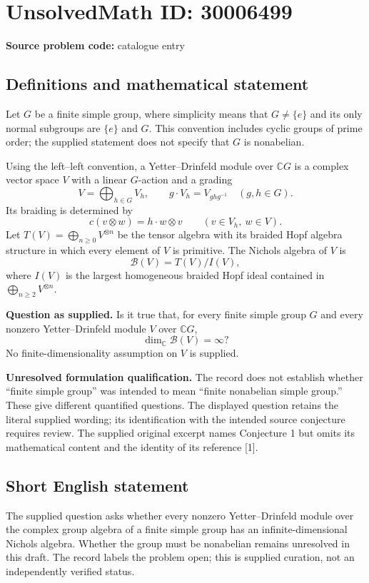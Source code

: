 \documentclass[11pt]{article}
\newcommand{\C}{\mathbb{C}}
\begin{document}
\section*{UnsolvedMath ID: 30006499}
\textbf{Source problem code:} catalogue entry
\subsection{Definitions and mathematical statement}
Let \(G\) be a finite simple group, where simplicity means that \(G\neq\{e\}\) and its only normal subgroups are \(\{e\}\) and \(G\). This convention includes cyclic groups of prime order; the supplied statement does not specify that \(G\) is nonabelian.

Using the left--left convention, a Yetter--Drinfeld module over \(\C G\) is a complex vector space \(V\) with a linear \(G\)-action and a grading
\[
V=\bigoplus_{h\in G}V_h,
\qquad g\cdot V_h=V_{ghg^{-1}}\quad(g,h\in G).
\]
Its braiding is determined by
\[
c(v\otimes w)=h\cdot w\otimes v
\qquad(v\in V_h,\ w\in V).
\]
Let \(T(V)=\bigoplus_{n\geq0}V^{\otimes n}\) be the tensor algebra with its braided Hopf algebra structure in which every element of \(V\) is primitive. The Nichols algebra of \(V\) is
\[
\mathcal B(V)=T(V)/I(V),
\]
where \(I(V)\) is the largest homogeneous braided Hopf ideal contained in \(\bigoplus_{n\geq2}V^{\otimes n}\).

\textbf{Question as supplied.} Is it true that, for every finite simple group \(G\) and every nonzero Yetter--Drinfeld module \(V\) over \(\C G\),
\[
\dim_{\C}\mathcal B(V)=\infty?
\]
No finite-dimensionality assumption on \(V\) is supplied.

\textbf{Unresolved formulation qualification.} The record does not establish whether ``finite simple group'' was intended to mean ``finite nonabelian simple group.'' These give different quantified questions. The displayed question retains the literal supplied wording; its identification with the intended source conjecture requires review. The supplied original excerpt names Conjecture 1 but omits its mathematical content and the identity of its reference [1].
\subsection{Short English statement}
The supplied question asks whether every nonzero Yetter--Drinfeld module over the complex group algebra of a finite simple group has an infinite-dimensional Nichols algebra. Whether the group must be nonabelian remains unresolved in this draft. The record labels the problem open; this is supplied curation, not an independently verified status.
\end{document}
